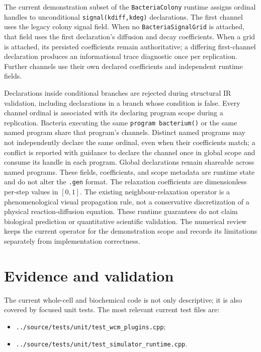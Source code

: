 The current demonstration subset of the \texttt{BacteriaColony} runtime assigns ordinal handles to
unconditional \texttt{signal(kdiff,kdeg)} declarations. The first channel uses
the legacy colony signal field. When no \texttt{BacteriaSignalGrid} is
attached, that field uses the first declaration's diffusion and decay
coefficients. When a grid is attached, its persisted coefficients remain
authoritative; a differing first-channel declaration produces an
informational trace diagnostic once per replication. Further channels use
their own declared coefficients and independent runtime fields.

Declarations inside conditional branches are rejected during structural IR
validation, including declarations in a branch whose condition is false.
Every channel ordinal is associated with its declaring program scope during a
replication. Bacteria executing the same \texttt{program bacterium()} or the
same named program share that program's channels. Distinct named programs may
not independently declare the same ordinal, even when their coefficients
match; a conflict is reported with guidance to declare the channel once in
global scope and consume its handle in each program. Global declarations
remain shareable across named programs. These fields, coefficients, and scope
metadata are runtime state and do not alter the \texttt{.gen} format. The
relaxation coefficients are dimensionless per-step values in $[0,1]$. The
existing neighbour-relaxation operator is a phenomenological visual
propagation rule, not a conservative discretization of a physical
reaction-diffusion equation. These runtime guarantees do not claim biological
prediction or quantitative scientific validation. The numerical review keeps
the current operator for the demonstration scope and records its limitations
separately from implementation correctness.

\section{Evidence and validation}

The current whole-cell and biochemical code is not only descriptive; it is also
covered by focused unit tests. The most relevant current test files are:
\begin{itemize}
\item \texttt{../source/tests/unit/test\_wcm\_plugins.cpp};
\item \texttt{../source/tests/unit/test\_simulator\_runtime.cpp}.
\end{itemize}

